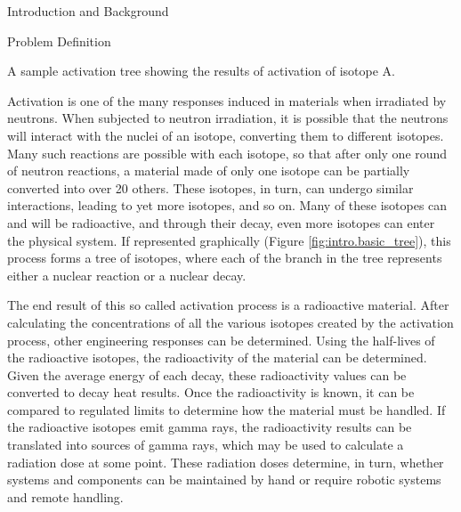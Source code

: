 \begin{chapter}{Introduction and Background}

\begin{section}{Problem Definition\label{sec:intro.prob_def}}

  \begin{floatingfigure}{0.55\columnwidth}
    \begin{center}
      \caption{A sample activation tree showing the results of
        activation of isotope A.}\label{fig:intro.basic_tree}
    \end{center}
  \end{floatingfigure}
  
  Activation is one of the many responses induced in materials when
  irradiated by neutrons.  When subjected to neutron irradiation, it
  is possible that the neutrons will interact with the nuclei of an
  isotope, converting them to different isotopes.  Many such reactions
  are possible with each isotope, so that after only one round of
  neutron reactions, a material made of only one isotope can be
  partially converted into over 20 others.  These isotopes, in turn,
  can undergo similar interactions, leading to yet more isotopes, and
  so on.  Many of these isotopes can and will be radioactive, and
  through their decay, even more isotopes can enter the physical
  system.  If represented graphically (Figure
  \ref{fig:intro.basic_tree}), this process forms a tree of isotopes,
  where each of the branch in the tree represents either a nuclear
  reaction or a nuclear decay.
    
  The end result of this so called activation process is a radioactive
  material.  After calculating the concentrations of all the various
  isotopes created by the activation process, other engineering
  responses can be determined.  Using the half-lives of the
  radioactive isotopes, the radioactivity of the material can be
  determined.  Given the average energy of each decay, these
  radioactivity values can be converted to decay heat results.  Once
  the radioactivity is known, it can be compared to regulated limits
  to determine how the material must be handled.  If the radioactive
  isotopes emit gamma rays, the radioactivity results can be
  translated into sources of gamma rays, which may be used to
  calculate a radiation dose at some point.  These radiation doses
  determine, in turn, whether systems and components can be maintained
  by hand or require robotic systems and remote handling.
    

\end{section}
\end{chapter}
